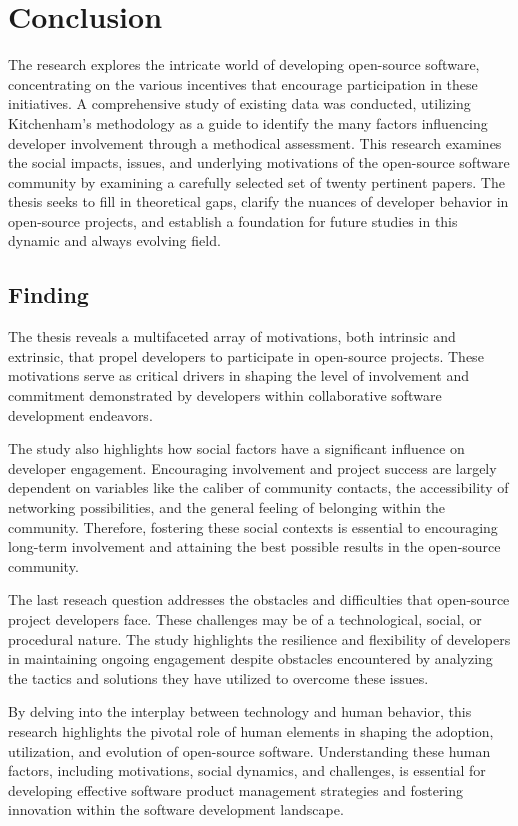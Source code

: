 \section{Conclusion}

The research explores the intricate world of developing open-source software, concentrating on the various incentives that encourage participation in these initiatives. A comprehensive study of existing data was conducted, utilizing Kitchenham's methodology as a guide to identify the many factors influencing developer involvement through a methodical assessment. This research examines the social impacts, issues, and underlying motivations of the open-source software community by examining a carefully selected set of twenty pertinent papers. The thesis seeks to fill in theoretical gaps, clarify the nuances of developer behavior in open-source projects, and establish a foundation for future studies in this dynamic and always evolving field.

\subsection{Finding}

The thesis reveals a multifaceted array of motivations, both intrinsic and extrinsic, that propel developers to participate in open-source projects. These motivations serve as critical drivers in shaping the level of involvement and commitment demonstrated by developers within collaborative software development endeavors.

The study also highlights how social factors have a significant influence on developer engagement. Encouraging involvement and project success are largely dependent on variables like the caliber of community contacts, the accessibility of networking possibilities, and the general feeling of belonging within the community. Therefore, fostering these social contexts is essential to encouraging long-term involvement and attaining the best possible results in the open-source community.

The last reseach question addresses the obstacles and difficulties that open-source project developers face. These challenges may be of a technological, social, or procedural nature. The study highlights the resilience and flexibility of developers in maintaining ongoing engagement despite obstacles encountered by analyzing the tactics and solutions they have utilized to overcome these issues.

By delving into the interplay between technology and human behavior, this research highlights the pivotal role of human elements in shaping the adoption, utilization, and evolution of open-source software. Understanding these human factors, including motivations, social dynamics, and challenges, is essential for developing effective software product management strategies and fostering innovation within the software development landscape.

